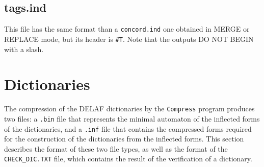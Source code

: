 \subsection{tags.ind}
\label{section-tags-ind}
This file has the same format than a \verb+concord.ind+ one obtained in MERGE
or REPLACE mode, but its header is \verb+#T+. Note that the outputs DO NOT BEGIN
with a slash.
 


\section{Dictionaries}
The compression of the DELAF dictionaries by the \verb+Compress+ program produces
two files: a \verb+.bin+ file that represents the minimal automaton of the
inflected forms of the dictionaries, and a \verb+.inf+ file that contains the
compressed forms required for the construction of the dictionaries from the
inflected forms. This section describes the format of these two file types, as
well as the format of the \verb+CHECK_DIC.TXT+ file, which contains the result of
the verification of a dictionary.


